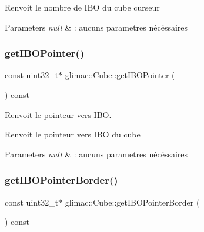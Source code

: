 Renvoit le nombre de I\+BO du cube curseur


\begin{DoxyParams}{Parameters}
{\em null} & \+: aucuns parametres nécéssaires \\
\hline
\end{DoxyParams}
\mbox{\label{classglimac_1_1Cube_a71a64cda0b1ed4f733d9d8132b2866b4}} 
\subsubsection{\texorpdfstring{get\+I\+B\+O\+Pointer()}{getIBOPointer()}}
{\footnotesize\ttfamily const uint32\+\_\+t$\ast$ glimac\+::\+Cube\+::get\+I\+B\+O\+Pointer (\begin{DoxyParamCaption}{ }\end{DoxyParamCaption}) const\hspace{0.3cm}{\ttfamily [inline]}}



Renvoit le pointeur vers I\+BO. 

Renvoit le pointeur vers I\+BO du cube


\begin{DoxyParams}{Parameters}
{\em null} & \+: aucuns parametres nécéssaires \\
\hline
\end{DoxyParams}
\mbox{\label{classglimac_1_1Cube_a93dd4105228440066a216b95697648ad}} 
\subsubsection{\texorpdfstring{get\+I\+B\+O\+Pointer\+Border()}{getIBOPointerBorder()}}
{\footnotesize\ttfamily const uint32\+\_\+t$\ast$ glimac\+::\+Cube\+::get\+I\+B\+O\+Pointer\+Border (\begin{DoxyParamCaption}{ }\end{DoxyParamCaption}) const\hspace{0.3cm}{\ttfamily [inline]}}



